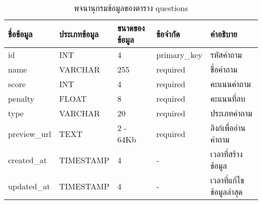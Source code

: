 \begin{table}[H]
    \caption{พจนานุกรมข้อมูลของตาราง questions}
    \label{tab:database-questions}
    \begin{tabularx}{\textwidth}{ | p{2.25cm} | p{2.20cm} | p{2.45cm} | p{2cm} | X | }
    \hline
    \textbf{ชื่อข้อมูล} & \textbf{ประเภทข้อมูล} & \textbf{ขนาดของข้อมูล} & \textbf{ข้อจำกัด} & \textbf{คำอธิบาย} \\
    \hline
    id & INT & 4 & primary\_key & รหัสคำถาม \\
    \hline
    name & VARCHAR & 255 & required & ชื่อคำถาม \\
    \hline
    score & INT & 4 & required & คะแนนคำถาม \\
    \hline
    penalty & FLOAT & 8 & required & คะแนนที่ลบ \\
    \hline
    type & VARCHAR & 20 & required & ประเภทคำถาม \\
    \hline
    preview\_url & TEXT & 2 - 64Kb & required & ลิงก์เพื่ออ่านคำถาม \\
    \hline
    created\_at & TIMESTAMP & 4 & - & เวลาที่สร้างข้อมูล \\
    \hline
    updated\_at & TIMESTAMP & 4 & - & เวลาที่แก้ไขข้อมูลล่าสุด \\
    \hline
    \end{tabularx}
\end{table}
